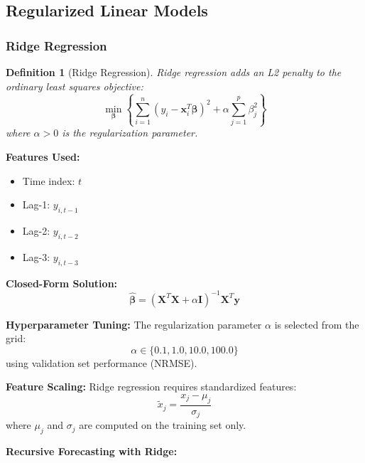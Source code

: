 \documentclass[12pt,a4paper]{article}
\newtheorem{definition}{Definition}[section]
\begin{document}
\subsection{Regularized Linear Models}

\subsubsection{Ridge Regression}

\begin{definition}[Ridge Regression]
Ridge regression adds an L2 penalty to the ordinary least squares objective:
\begin{equation}
\min_{\boldsymbol{\beta}} \left\{ \sum_{i=1}^{n}(y_i - \mathbf{x}_i^T\boldsymbol{\beta})^2 + \alpha \sum_{j=1}^{p}\beta_j^2 \right\}
\end{equation}
where $\alpha > 0$ is the regularization parameter.
\end{definition}

\textbf{Features Used:}
\begin{itemize}
    \item Time index: $t$
    \item Lag-1: $y_{i,t-1}$
    \item Lag-2: $y_{i,t-2}$
    \item Lag-3: $y_{i,t-3}$
\end{itemize}

\textbf{Closed-Form Solution:}
\begin{equation}
\hat{\boldsymbol{\beta}} = (\mathbf{X}^T\mathbf{X} + \alpha\mathbf{I})^{-1}\mathbf{X}^T\mathbf{y}
\end{equation}

\textbf{Hyperparameter Tuning:}
The regularization parameter $\alpha$ is selected from the grid:
\begin{equation}
\alpha \in \{0.1, 1.0, 10.0, 100.0\}
\end{equation}
using validation set performance (NRMSE).

\textbf{Feature Scaling:}
Ridge regression requires standardized features:
\begin{equation}
\tilde{x}_j = \frac{x_j - \mu_j}{\sigma_j}
\end{equation}
where $\mu_j$ and $\sigma_j$ are computed on the training set only.

\textbf{Recursive Forecasting with Ridge:}
\end{document}
